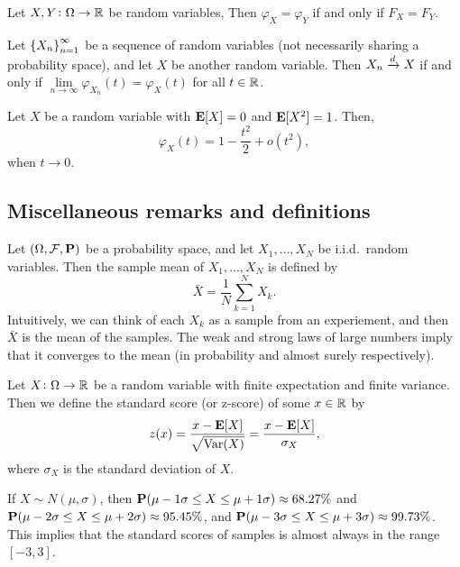\documentclass[11pt,a4paper]{article}
\begin{document}
\begin{proposition}
  Let $X,Y \colon \Omega \to \mathbb{R}$ be random variables,
  Then $\varphi_X = \varphi_Y$ if and only if $F_X = F_Y$.
\end{proposition}

\begin{theorem}
  Let $\left\{X_n\right\}_{n=1}^{\infty}$ be a sequence of random variables
  (not necessarily sharing a probability space),
  and let $X$ be another random variable.
  Then $X_n \xrightarrow{d} X$ if and only if
  $\lim\limits_{n \to \infty} \varphi_{X_n}(t) = \varphi_X(t)$
  for all $t \in \mathbb{R}$.
\end{theorem}

\begin{proposition}
  Let $X$ be a random variable with $\mathbf{E}[X] = 0$
  and $\mathbf{E}[X^2] = 1$.
  Then,
  \[
    \varphi_X(t) = 1 - \frac{t^2}{2} + o(t^2),
  \]
  when $t \to 0$.
\end{proposition}

\subsection{Miscellaneous remarks and definitions}

\begin{definition}
  Let $(\Omega, \mathcal F, \mathbf{P})$ be a probability space,
  and let $X_1,\dots,X_N$ be i.i.d.\ random variables.
  Then the sample mean of $X_1,\dots,X_N$ is defined by
  \[
    \bar X = \frac{1}{N} \sum_{k=1}^{N} X_k.
  \]
  Intuitively, we can think of each $X_k$ as a sample from an experiement,
  and then $\bar X$ is the mean of the samples.
  The weak and strong laws of large numbers imply that it converges
  to the mean (in probability and almost surely respectively).
\end{definition}

\begin{definition}
  Let $X \colon \Omega \to \mathbb{R}$ be a random variable
  with finite expectation and finite variance.
  Then we define the standard score (or z-score) of some $x \in \mathbb{R}$ by
  \[
    z(x) =
    \frac{x - \mathbf{E}[X]}{\sqrt{\operatorname{Var}(X)}} =
    \frac{x - \mathbf{E}[X]}{\sigma_X},
  \]
  where $\sigma_X$ is the standard deviation of $X$.
\end{definition}
\begin{remark}[68–95–99.7 rule]
  If $X \sim N(\mu,\sigma)$,
  then $\mathbf{P}(\mu -1\sigma \leq X\leq \mu +1\sigma ) \approx 68.27\%$
  and $\mathbf{P}(\mu -2\sigma \leq X\leq \mu +2\sigma ) \approx 95.45\%$,
  and $\mathbf{P}(\mu -3\sigma \leq X\leq \mu +3\sigma ) \approx 99.73\%$.
  This implies that the standard scores of samples
  is almost always in the range $[-3,3]$.
\end{remark}
\end{document}
